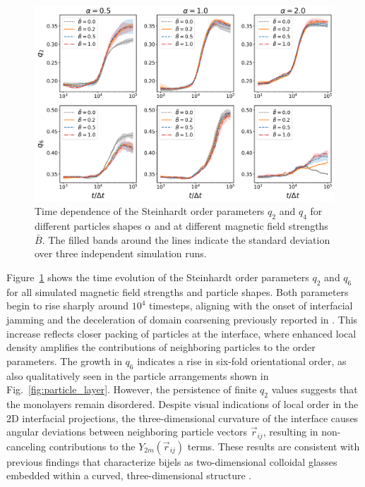 \begin{figure}
\centering
\includegraphics[scale = 0.38]{../figures/results/paper1_5/steinhardt_time.png}%
\caption{Time dependence of the Steinhardt order parameters $q_2$ and $q_4$ for different particles shapes $\alpha$ and at different magnetic field strengths $\bar{B}$. The filled bands around the lines indicate the standard deviation over three independent simulation runs.}
\label{fig:steinhardt_time}%
\end{figure}

Figure~\ref{fig:steinhardt_time} shows the time evolution of the Steinhardt order parameters \(q_2\) and \(q_6\) for all simulated magnetic field strengths and particle shapes. Both parameters begin 
to rise sharply around \(10^4\) timesteps, aligning with the onset of interfacial jamming and the deceleration of domain coarsening previously reported in \cite{karthikeyan_formation_2024}. This increase 
reflects closer packing of particles at the interface, where enhanced local density amplifies the contributions of neighboring particles to the order parameters. The growth in \(q_6\) indicates a 
rise in six-fold orientational order, as also qualitatively seen in the particle arrangements shown in Fig.~\ref{fig:particle_layer}. However, the persistence of finite \(q_2\) values suggests that the 
monolayers remain disordered. Despite visual indications of local order in the 2D interfacial projections, the three-dimensional curvature of the interface causes angular deviations between neighboring 
particle vectors \(\vec{r}_{ij}\), resulting in non-canceling contributions to the \(Y_{2m}(\vec{r}_{ij})\) terms. These results are consistent with previous findings that characterize bijels as two-dimensional 
colloidal glasses embedded within a curved, three-dimensional structure \cite{ching_bijel_2022}.

